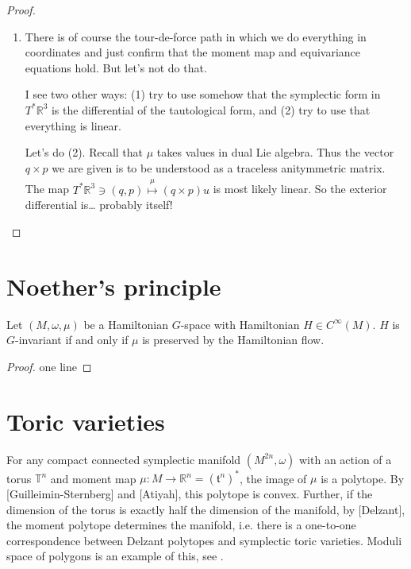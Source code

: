 \begin{proof}
\begin{enumerate}
\item There is of course the tour-de-force
path in which we do everything in
coordinates and just confirm that
the moment map and equivariance equations
hold. But let's not do that.

I see two other ways: (1) try to use somehow
that the symplectic form in $T^*\mathbb{R}^3$
is the differential of the tautological
form, and (2) try to use that everything
is linear.

Let's do (2). Recall that $\mu$
takes values in dual Lie algebra.
Thus the vector $q\times p$ we are given
is to be understood as a traceless
anitymmetric matrix. The map
$T^*\mathbb{R}^3 \ni (q,p) 
\overset{\hat{\mu}}{\mapsto } 
(q\times p)u$
is most likely linear.
So the exterior differential is…
probably itself!
\end{enumerate}
\end{proof}

\section{Noether's principle}
\label{section-Noether-principle}

\begin{theorem}
\label{theorem-Noether-principle}
Let $(M,\omega,\mu)$ be a Hamiltonian
$G$-space with Hamiltonian
$H\in C^\infty(M)$. $H$ is $G$-invariant if
and only if $\mu$ is preserved by
the Hamiltonian flow.
\end{theorem}

\begin{proof}
one line
\end{proof}


\section{Toric varieties}
\label{section-toric-varieties}

\noindent
For any compact connected symplectic manifold
$(M^{2n},\omega)$ with an action
of a torus $\mathbb{T}^n$ and moment map
$\mu:M \to \mathbb{R}^n
=(\mathfrak{t}^n)^*$, the image of $\mu$
is a polytope. By [Guilleimin-Sternberg] and
[Atiyah], this polytope is
convex. Further, if the dimension of the
torus is exactly half
the dimension of the manifold, by [Delzant],
the moment polytope
determines the manifold, i.e. there is a
one-to-one
correspondence between
Delzant polytopes and symplectic toric
varieties.
Moduli space of polygons is an example of
this,
see \cite{moduli-polygons}.

